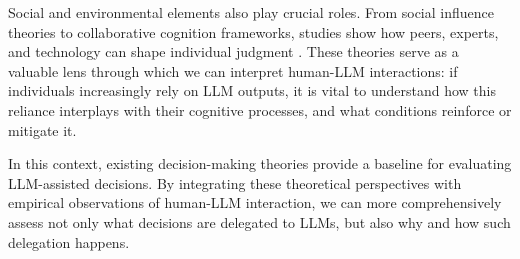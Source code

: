 Social and environmental elements also play crucial roles. From social influence theories to collaborative cognition frameworks, studies show how peers, experts, and technology can shape individual judgment \cite{gracia2003groupdeliberation, ma2024deliberation}. These theories serve as a valuable lens through which we can interpret human-LLM interactions: if individuals increasingly rely on LLM outputs, it is vital to understand how this reliance interplays with their cognitive processes, and what conditions reinforce or mitigate it.

In this context, existing decision-making theories provide a baseline for evaluating LLM-assisted decisions. By integrating these theoretical perspectives with empirical observations of human-LLM interaction, we can more comprehensively assess not only what decisions are delegated to LLMs, but also why and how such delegation happens.
